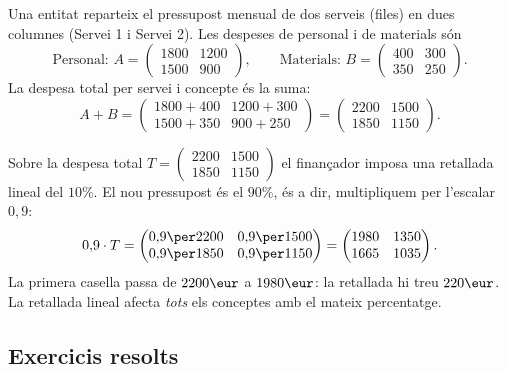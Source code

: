 \begin{exemple}
Una entitat reparteix el pressupost mensual de dos serveis (files) en dues
columnes (Servei 1 i Servei 2). Les despeses de personal i de materials són
\[
\text{Personal: } A=\begin{pmatrix} 1800 & 1200 \\ 1500 & 900 \end{pmatrix},\qquad
\text{Materials: } B=\begin{pmatrix} 400 & 300 \\ 350 & 250 \end{pmatrix}.
\]
La despesa total per servei i concepte és la suma:
\[
A+B=\begin{pmatrix} 1800+400 & 1200+300 \\ 1500+350 & 900+250 \end{pmatrix}
    =\begin{pmatrix} 2200 & 1500 \\ 1850 & 1150 \end{pmatrix}.
\]
\end{exemple}

\begin{exemple}
Sobre la despesa total $T=\begin{pmatrix} 2200 & 1500 \\ 1850 & 1150 \end{pmatrix}$
el finançador imposa una retallada lineal del $10\%$. El nou pressupost és el
$90\%$, és a dir, multipliquem per l'escalar $0{,}9$:
\[
0{,}9\cdot T=\begin{pmatrix} 0{,}9\per 2200 & 0{,}9\per 1500 \\ 0{,}9\per 1850 & 0{,}9\per 1150 \end{pmatrix}
            =\begin{pmatrix} 1980 & 1350 \\ 1665 & 1035 \end{pmatrix}.
\]
La primera casella passa de $2200\eur$ a $1980\eur$: la retallada hi treu $220\eur$.
La retallada lineal afecta \emph{tots} els conceptes amb el mateix percentatge.
\end{exemple}

\subsection{Exercicis resolts}

